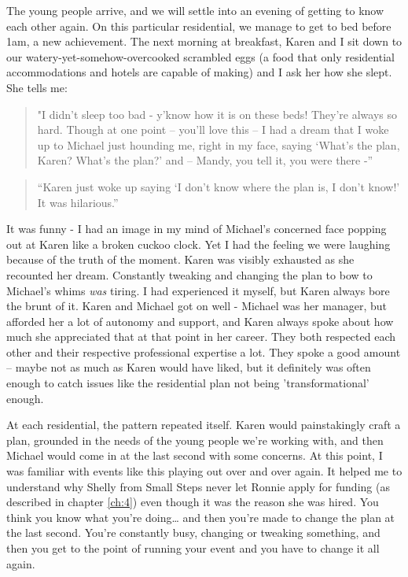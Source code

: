 The young people arrive, and we will settle into an evening of getting to know each other again. On this particular residential, we manage to get to bed before 1am, a new achievement. The next morning at breakfast, Karen and I sit down to our watery-yet-somehow-overcooked scrambled eggs (a food that only residential accommodations and hotels are capable of making) and I ask her how she slept. She tells me:

\begin{quote}
"I didn’t sleep too bad - y’know how it is on these beds! They’re always so hard. Though at one point – you’ll love this – I had a dream that I woke up  to Michael just hounding me, right in my face, saying ‘What’s the plan, Karen? What’s the plan?’ and – Mandy, you tell it, you were there -”
\end{quote}
\begin{quote}
    
“Karen just woke up saying ‘I don’t know where the plan is, I don’t know!’ It was hilarious.”

\end{quote}
It was funny - I had an image in my mind of Michael’s concerned face popping out at Karen like a broken cuckoo clock. Yet I had the feeling we were laughing because of the truth of the moment. Karen was visibly exhausted as she recounted her dream. Constantly tweaking and changing the plan to bow to Michael’s whims \emph{was} tiring. I had experienced it myself, but Karen always bore the brunt of it. Karen and Michael got on well - Michael was her manager, but afforded her a lot of autonomy and support, and Karen always spoke about how much she appreciated that at that point in her career. They both respected each other and their respective professional expertise a lot. They spoke a good amount – maybe not as much as Karen would have liked, but it definitely was often enough to catch issues like the residential plan not being 'transformational' enough.

At each residential, the pattern repeated itself. Karen would painstakingly craft a plan, grounded in the needs of the young people we’re working with, and then Michael would come in at the last second with some concerns. At this point, I was familiar with events like this playing out over and over again. It helped me to understand why Shelly from Small Steps never let Ronnie apply for funding (as described in chapter \ref{ch:4}) even though it was the reason she was hired.  You think you know what you’re doing… and then you’re made to change the plan at the last second. You’re constantly busy, changing or tweaking something, and then you get to the point of running your event and you have to change it all again. 

